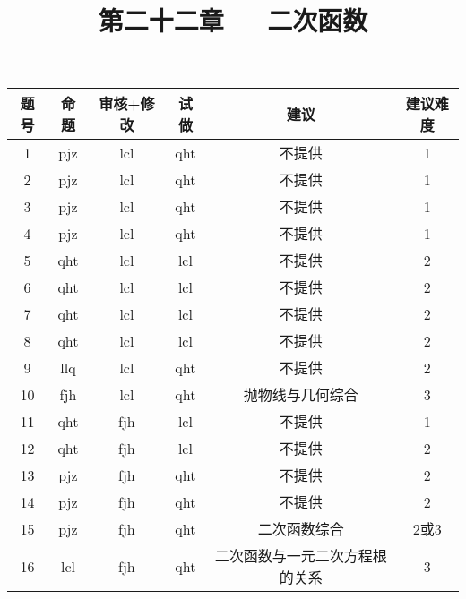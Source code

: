 \documentclass[11pt]{article}
\title{\heiti 第二十二章~~~二次函数}
\date{}
\author{}
\begin{document}
\maketitle
\begin{table}[htbp]
  \centering
    \begin{tabular}{cccccc}
    \toprule
    题号          & 命题          & 审核+修改       & 试做          & 建议          & 建议难度 \\
    \midrule
    1           & pjz         & lcl         & qht         & 不提供         & 1 \\
    \midrule
    2           & pjz         & lcl         & qht         & 不提供         & 1 \\
    \midrule
    3           & pjz         & lcl         & qht         & 不提供         & 1 \\
    \midrule
    4           & pjz         & lcl         & qht         & 不提供         & 1 \\
    \midrule
    5           & qht         & lcl         & lcl         & 不提供         & 2 \\
    \midrule
    6           & qht         & lcl         & lcl         & 不提供         & 2 \\
    \midrule
    7           & qht         & lcl         & lcl         & 不提供         & 2 \\
    \midrule
    8           & qht         & lcl         & lcl         & 不提供         & 2 \\
    \midrule
    9           & llq         & lcl         & qht         & 不提供         & 2 \\
    \midrule
    10          & fjh         & lcl         & qht         & 抛物线与几何综合    & 3 \\
    \midrule
    11          & qht         & fjh         & lcl         & 不提供         & 1 \\
    \midrule
    12          & qht         & fjh         & lcl         & 不提供         & 2 \\
    \midrule
    13          & pjz         & fjh         & qht         & 不提供         & 2 \\
    \midrule
    14          & pjz         & fjh         & qht         & 不提供         & 2 \\
    \midrule
    15          & pjz         & fjh         & qht         & 二次函数综合      & 2或3 \\
    \midrule
    16          & lcl         & fjh         & qht         & 二次函数与一元二次方程根的关系 & 3 \\

\end{tabular}
\end{table}
\end{document}
